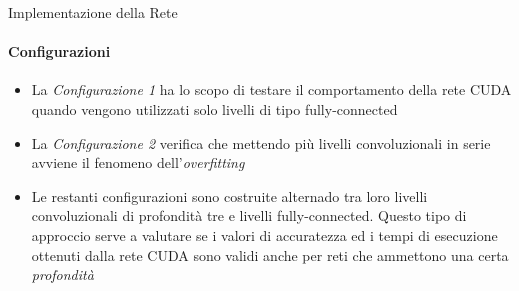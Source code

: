 \documentclass[
 ]{beamer}
\begin{document}
\begin{frame}{Implementazione della Rete}
    \framesubtitle{Configurazioni}

    \begin{itemize} [<+->]
        \setlength\itemsep{2em}
        \item \large La \emph{Configurazione 1} ha lo scopo di testare il comportamento della rete CUDA quando vengono utilizzati solo livelli di tipo fully-connected
        \item \large La \emph{Configurazione 2} verifica che mettendo più livelli convoluzionali in serie avviene il fenomeno dell'\emph{overfitting}       
        \item \large Le restanti configurazioni sono costruite alternado tra loro livelli convoluzionali di profondità tre e livelli fully-connected. Questo tipo di approccio serve a valutare se i valori di accuratezza ed i tempi di esecuzione ottenuti dalla rete CUDA sono validi anche per reti che ammettono una certa \emph{profondità}
    \end{itemize}     
\end{frame}

\end{document}
